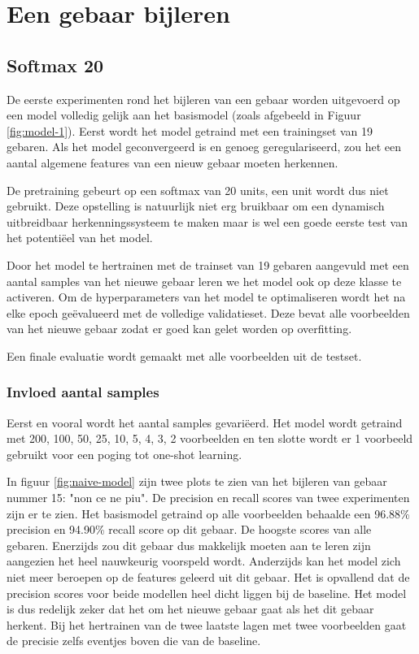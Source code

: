 \section{Een gebaar bijleren}\label{sec:experimenten}

\subsection{Softmax 20}

De eerste experimenten rond het bijleren van een gebaar worden uitgevoerd op een model volledig gelijk aan het basismodel (zoals afgebeeld in Figuur \ref{fig:model-1}). Eerst wordt het model getraind met een trainingset van 19 gebaren. Als het model geconvergeerd is en genoeg geregulariseerd, zou het een aantal algemene features van een nieuw gebaar moeten herkennen.

\npar De pretraining gebeurt op een softmax van 20 units, een unit wordt dus niet gebruikt. Deze opstelling is natuurlijk niet erg bruikbaar om een dynamisch uitbreidbaar herkenningssysteem te maken maar is wel een goede eerste test van het potenti\"eel van het model.

\npar Door het model te hertrainen met de trainset van 19 gebaren aangevuld met een aantal samples van het nieuwe gebaar leren we het model ook op deze klasse te activeren. Om de hyperparameters van het model te optimaliseren wordt het na elke epoch ge\"evalueerd met de volledige validatieset. Deze bevat alle voorbeelden van het nieuwe gebaar zodat er goed kan gelet worden op overfitting.

\npar Een finale evaluatie wordt gemaakt met alle voorbeelden uit de testset. 

\subsubsection{Invloed aantal samples}
Eerst en vooral wordt het aantal samples gevari\"eerd. Het model wordt getraind met 200, 100, 50, 25, 10, 5, 4, 3, 2 voorbeelden en ten slotte wordt er 1 voorbeeld gebruikt voor een poging tot one-shot learning.

\npar In figuur \ref{fig:naive-model} zijn twee plots te zien van het bijleren van gebaar nummer 15: "non ce ne piu". De precision en recall scores van twee experimenten zijn er te zien. Het basismodel getraind op alle voorbeelden behaalde een 96.88\% precision en 94.90\% recall score op dit gebaar. De hoogste scores van alle gebaren. Enerzijds zou dit gebaar dus makkelijk moeten aan te leren zijn aangezien het heel nauwkeurig voorspeld wordt. Anderzijds kan het model zich niet meer beroepen op de features geleerd uit dit gebaar.
\npar Het is opvallend dat de precision scores voor beide modellen heel dicht liggen bij de baseline. Het model is dus redelijk zeker dat het om het nieuwe gebaar gaat als het dit gebaar herkent. Bij het hertrainen van de twee laatste lagen met twee voorbeelden gaat de precisie zelfs eventjes boven die van de baseline.

